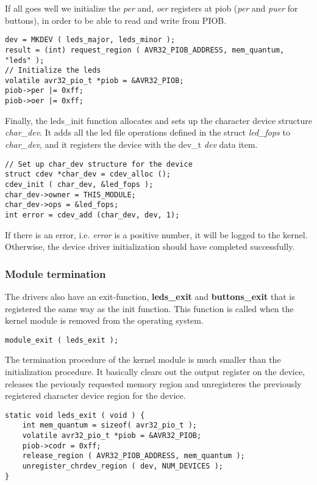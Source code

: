 If all goes well we initialize the \textit{per} and, 
\textit{oer} registers at piob (\textit{per} and \textit{puer}
for buttons), in order to be able to read and write from PIOB.
\\
\begin{lstlisting}
dev = MKDEV ( leds_major, leds_minor );
result = (int) request_region ( AVR32_PIOB_ADDRESS, mem_quantum, "leds" );
// Initialize the leds
volatile avr32_pio_t *piob = &AVR32_PIOB;
piob->per |= 0xff;
piob->oer |= 0xff;
\end{lstlisting}
Finally, the leds\_init function allocates and sets up the character 
device structure \textit{char\_dev}. 
It adds all the led file operations defined in
the struct \textit{led\_fops} to \textit{char\_dev}, and 
it registers the device with the dev\_t \textit{dev} data item.
\\
\begin{lstlisting}
// Set up char_dev structure for the device
struct cdev *char_dev = cdev_alloc ();
cdev_init ( char_dev, &led_fops );
char_dev->owner = THIS_MODULE;
char_dev->ops = &led_fops;
int error = cdev_add (char_dev, dev, 1);
\end{lstlisting}
If there is an error, i.e. \textit{error} is a positive number, it will
be logged to the kernel. Otherwise, the device driver initialization 
should have completed successfully.

\subsubsection{Module termination}
The drivers also have an exit-function, \textbf{leds\_exit} and 
\textbf{buttons\_exit} that is registered the same way as 
the init function. This function is called when the kernel module is 
removed from the operating system. 
\\
\begin{lstlisting}
module_exit ( leds_exit );
\end{lstlisting}
The termination procedure of the kernel module is much smaller than the 
initialization procedure. It basically clears out the output register
on the device, releases the peviously requested memory region and
unregisteres the previously registered character device region for
the device.
\\
\begin{lstlisting}
static void leds_exit ( void ) {
	int mem_quantum = sizeof( avr32_pio_t );
	volatile avr32_pio_t *piob = &AVR32_PIOB;
	piob->codr = 0xff;
	release_region ( AVR32_PIOB_ADDRESS, mem_quantum );
	unregister_chrdev_region ( dev, NUM_DEVICES );
}
\end{lstlisting}

